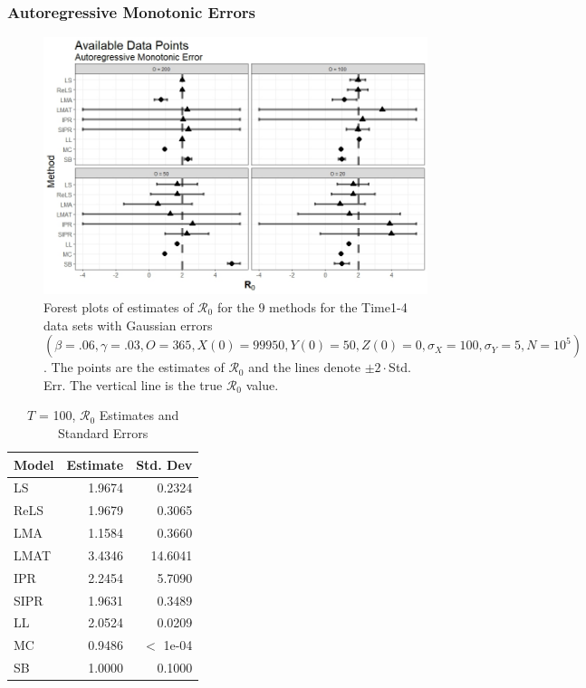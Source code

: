 \documentclass[12pt]{article}
\newcommand{\xxsir}{\ensuremath{9} } %
\newcommand{\rr}{\ensuremath{\mathcal{R}_0}}
\begin{document}
\subsubsection{Autoregressive Monotonic Errors}
\begin{figure}[H]
	\centering
	\includegraphics[scale=0.5]{images/time_arm.jpeg}
	\caption{Forest plots of estimates of $\rr$ for the \xxsir methods for the Time1-4 data sets with Gaussian errors $(\beta=.06, \gamma=.03, O=365, X(0)=99950, Y(0)=50, Z(0)=0, \sigma_X=100, \sigma_Y=5, N=10^5)$.  The points are the estimates of $\rr$ and the lines denote $\pm 2\cdot $Std. Err.  The vertical line is the true $\rr$ value.}
\end{figure}

\begin{table}[H]
	
	
	\centering
	\begin{tabular}[t]{l|r|r}
		\hline
		Model & Estimate & Std. Dev\\
		\hline
		LS & 1.9674 & 0.2324\\
		\hline
		ReLS & 1.9679 & 0.3065\\
		\hline
		LMA & 1.1584 & 0.3660\\
		\hline
		LMAT & 3.4346 & 14.6041\\
		\hline
		IPR & 2.2454 & 5.7090\\
		\hline
		SIPR & 1.9631 & 0.3489\\
		\hline
		LL & 2.0524 & 0.0209\\
		\hline
		MC & 0.9486 & $<$ 1e-04\\
		\hline
		SB & 1.0000 & 0.1000\\
		\hline
	\end{tabular}
	\caption{ $T$ = 100, $\rr$ Estimates and Standard Errors}
\end{table}
\end{document}
